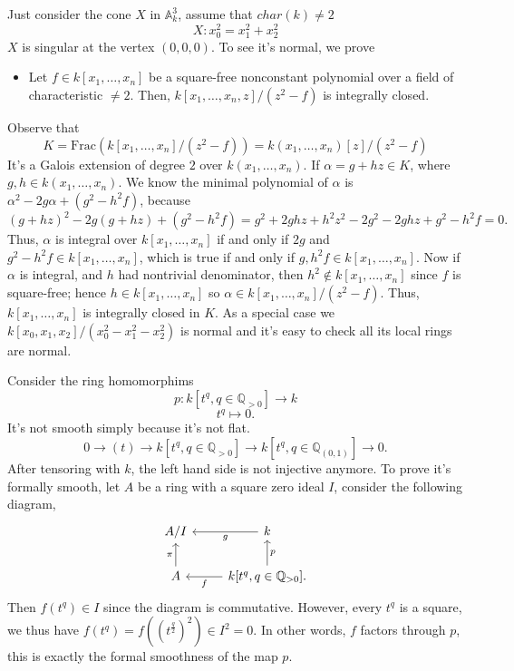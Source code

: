 \documentclass[../main.tex]{subfiles}
\begin{document}
\begin{example}
Just consider the cone $X$ in $\mathbb{A}_{k}^{3}$, assume that $char(k)\neq 2$
$$X: x_{0}^{2}=x_{1}^{2}+x_{2}^{2}$$
$X$ is singular at the vertex $(0,0,0)$. To see it's normal, we prove 
\begin{itemize}
\item Let $f \in k[x_1,\ldots,x_n]$ be a square-free nonconstant polynomial over a field of characteristic $\ne 2$. Then, $k[x_1,\ldots,x_n,z]/(z^2-f)$ is integrally closed.
\end{itemize}
Observe that $$K=\mathrm{Frac}(k[x_{1},\dots, x_{n}]/(z^{2}-f))=k(x_{1},\dots, x_{n})[z]/(z^{2}-f)$$ It's a Galois extension of degree $2$ over $k(x_{1},\dots, x_{n}) $. If $\alpha = g + hz \in K$, where $g,h \in k(x_1,\ldots,x_n)$. We know the minimal polynomial of $\alpha$ is
$\alpha^2 - 2g\alpha + (g^2-h^2f)$, because
  $$
    (g+hz)^2 - 2g(g+hz) + (g^2 - h^2f) = g^2 + 2ghz + h^2z^2 - 2g^2 - 2ghz + g^2 - h^2f = 0.
  $$
  Thus, $\alpha$ is integral over $k[x_1,\ldots,x_n]$ if and only if
  $2g$ and $g^2-h^2f \in k[x_1,\ldots,x_n]$, which is true if and only if $g, h^2f \in
  k[x_1,\ldots,x_n]$. Now if $\alpha$ is integral, and $h$ had nontrivial
  denominator, then $h^2 \notin k[x_1,\ldots,x_n]$ since $f$ is square-free;
  hence $h \in k[x_1,\ldots,x_n]$ so $\alpha \in k[x_{1},\dots, x_{n}]/(z^{2}-f)$. Thus, $k[x_{1},\dots, x_{n}]$ is integrally closed in $K$. As a special case we $k[x_{0},x_{1},x_{2}]/(x_{0}^{2}-x_{1}^{2}-x_{2}^{2})$ is normal and it's easy to check all its local rings are normal.
\end{example}

\begin{example}
 Consider the ring homomorphims $$p: k[t^{q}, q\in \mathbb{Q}_{>0}]\rightarrow k$$
 $$t^{q}\mapsto 0.$$
 It's not smooth simply because it's not flat. 
 $$0\rightarrow (t)\rightarrow k[t^{q}, q\in \mathbb{Q}_{>0}]\rightarrow k[t^{q}, q\in \mathbb{Q}_{(0,1)}]\rightarrow 0.$$ 
 After tensoring with $k$, the left hand side is not injective anymore. To prove it's formally smooth, let $A$ be a ring with a square zero ideal $I$, consider the following diagram,
 $$
 \begin{tikzcd}
 A/I & k \arrow{l}{g}\\
 A\arrow{u}{\pi} &  k[t^{q}, q\in \mathbb{Q}_{>0}]\arrow{l}{f}\arrow{u}[swap]{p}.
 \end{tikzcd}
 $$
 Then $f(t^{q})\in I$ since the diagram is commutative. However, every $t^{q}$ is a square, we thus have $f(t^{q})=f((t^{\frac{q}{2}})^{2})\in I^{2}=0$. In other words, $f$ factors through $p$, this is exactly the formal smoothness of the map $p$.
 
\end{example}
\end{document}
